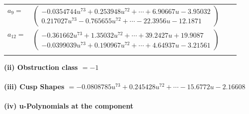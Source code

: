 \documentclass[1p]{elsarticle_modified}
\theoremstyle{definition}
\begin{document}
\begin{tabular}{m{7pt} m{180pt} m{7pt} m{180pt} }
\flushright $a_{9}=$&$\begin{pmatrix}-0.0354744 u^{73}+0.253948 u^{72}+\cdots+6.90667 u-3.95032\\0.217027 u^{73}-0.765655 u^{72}+\cdots-22.3956 u-12.1871\end{pmatrix}$ \\
\flushright $a_{12}=$&$\begin{pmatrix}-0.361662 u^{73}+1.35032 u^{72}+\cdots+39.2427 u+19.9087\\-0.0399039 u^{73}+0.190967 u^{72}+\cdots+4.64937 u-3.21561\end{pmatrix}$\\&\end{tabular}
\flushleft \textbf{(ii) Obstruction class $= -1$}\\~\\
\flushleft \textbf{(iii) Cusp Shapes $= -0.0808785 u^{73}+0.245428 u^{72}+\cdots-15.6772 u-2.16608$}\\~\\
\newpage\renewcommand{\arraystretch}{1}
\flushleft \textbf{(iv) u-Polynomials at the component}\newline \\
\end{document}
